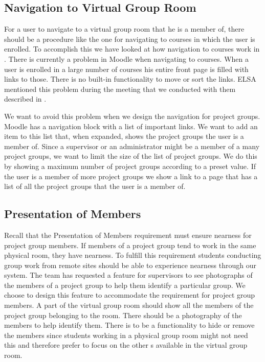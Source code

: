 \subsection{Navigation to Virtual Group Room}
\label{sub:designprojectgroupnavigation}
For a user to navigate to a virtual group room that he is a member of, there should be a procedure like the one for navigating to courses in which the user is enrolled.
To accomplish this we have looked at how navigation to courses work in \moodle{}.
There is currently a problem in Moodle when navigating to courses. 
When a user is enrolled in a large number of courses his entire front page is filled with links to those.
There is no built-in functionality to move or sort the links.
ELSA mentioned this problem during the meeting that we conducted with them described in .

We want to avoid this problem when we design the navigation for project groups.
Moodle has a navigation block with a list of important links.
We want to add an item to this list that, when expanded, shows the project groups the user is a member of.
Since a supervisor or an administrator might be a member of a many project groups, we want to limit the size of the list of project groups.
We do this by showing a maximum number of project groups according to a preset value.
If the user is a member of more project groups we show a link to a page that has a list of all the project groups that the user is a member of.


\subsection{Presentation of Members}
\label{sub:projGrpMembers}
Recall that the Presentation of Members requirement must ensure nearness for project group members.
If members of a project group tend to work in the same physical room, they have nearness.
To fulfill this requirement students conducting group work from remote sites should be able to experience nearness through our system.
The \supervisorgroup{} team has requested a feature for supervisors to see photographs of the members of a project group to help them identify a particular group.
We choose to design this feature to accommodate the requirement for project group members.
A part of the virtual group room should show all the members of the project group belonging to the room.
There should be a photography of the members to help identify them.
There is to be a functionality to hide or remove the members since students working in a physical group room might not need this and therefore prefer to focus on the other \detdeandrelaver[]s available in the virtual group room.

